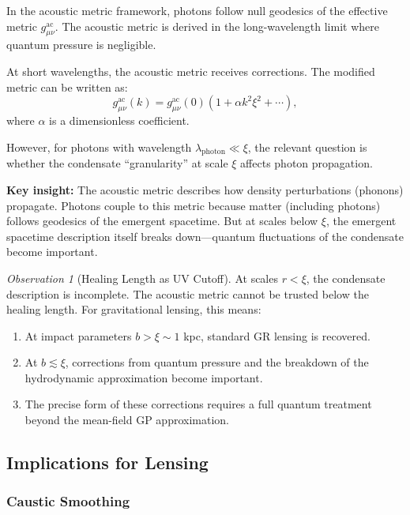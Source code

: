 \documentclass[11pt,a4paper]{article}
\theoremstyle{definition}
\theoremstyle{remark}
\newtheorem{observation}{Observation}[section]
\begin{document}
In the acoustic metric framework, photons follow null geodesics of the effective metric $g_{\mu\nu}^{\mathrm{ac}}$. The acoustic metric is derived in the long-wavelength limit where quantum pressure is negligible.

At short wavelengths, the acoustic metric receives corrections. The modified metric can be written as:
\begin{equation}
g_{\mu\nu}^{\mathrm{ac}}(k) = g_{\mu\nu}^{\mathrm{ac}}(0) \left(1 + \alpha k^2 \xi^2 + \cdots\right),
\end{equation}
where $\alpha$ is a dimensionless coefficient.

However, for photons with wavelength $\lambda_{\mathrm{photon}} \ll \xi$, the relevant question is whether the condensate ``granularity'' at scale $\xi$ affects photon propagation.

\textbf{Key insight:} The acoustic metric describes how density perturbations (phonons) propagate. Photons couple to this metric because matter (including photons) follows geodesics of the emergent spacetime. But at scales below $\xi$, the emergent spacetime description itself breaks down---quantum fluctuations of the condensate become important.

\begin{observation}[Healing Length as UV Cutoff]
At scales $r < \xi$, the condensate description is incomplete. The acoustic metric cannot be trusted below the healing length. For gravitational lensing, this means:
\begin{enumerate}
\item At impact parameters $b > \xi \sim 1$ kpc, standard GR lensing is recovered.
\item At $b \lesssim \xi$, corrections from quantum pressure and the breakdown of the hydrodynamic approximation become important.
\item The precise form of these corrections requires a full quantum treatment beyond the mean-field GP approximation.
\end{enumerate}
\end{observation}

\subsection{Implications for Lensing}
\label{sec:lensing_implications}

\subsubsection{Caustic Smoothing}
\end{document}
